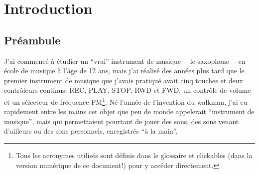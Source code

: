 %
\chapter{Introduction}
\label{ch:introduction}
%


\section{Préambule}
\label{sec:introduction:preamble}


\noindent J'ai commencé à étudier un ``vrai'' instrument de musique --~le saxophone~-- en école de musique à l'âge de 12 ans, mais j'ai réalisé des années plus tard que le premier instrument de musique que j'avais pratiqué avait cinq touches et deux contrôleurs continus: REC, PLAY, STOP, RWD et FWD, un contrôle de volume et un sélecteur de fréquence \gls{FM}\footnote{Tous les acronymes utilisés sont définis dans le glossaire et clickables (dans la version numérique de ce document!) pour y accéder directement.}. Né l'année de l'invention du walkman, j'ai eu rapidement entre les mains cet objet que peu de monde appelerait ``instrument de musique'', mais qui permettaient pourtant de jouer des sons, des sons venant d'ailleurs ou des sons personnels, enregistrés ``à la main''.\\


